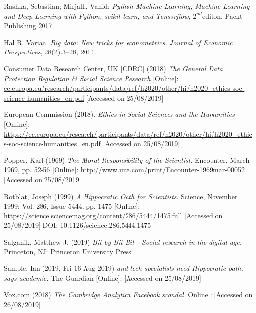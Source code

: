 \documentclass[12pt,a4paper]{article}
\begin{document}
Rashka, Sebastian; Mirjalli, Vahid; \textit{Python Machine Learning, Machine Learning and Deep Learning with Python, scikit-learn, and Tensorflow}, $2^{nd}$editon, Packt Publishing 2017.


Hal R. Varian. \textit{Big data: New tricks for econometrics. Journal of Economic Perspectives}, 28(2):3–28, 2014. 

Consumer Data Research Center, UK  [CDRC] (2018) \textit{The General Data Protection Regulation \& Social Science Research} [Online]: \href{https://ec.europa.eu/research/participants/data/ref/h2020/other/hi/h2020_ethics-soc-science-humanities_en.pdf}{ec.europa.eu/research/participants/data/ref/h2020/other/hi/h2020\_ethics-soc-science-humanities\_en.pdf} [Accessed on 25/08/2019]

European Commission (2018). \textit{Ethics in Social Sciences and the Humanities} [Online]: \href{https://ec.europa.eu/research/participants/data/ref/h2020/other/hi/h2020_ethics-soc-science-humanities_en.pdf}{https://ec.europa.eu/research/participants/data/ref/h2020/other/hi/h2020\_ethics-soc-science-humanities\_en.pdf} [Accessed on 25/08/2019] 

Popper, Karl (1969) \textit{The Moral Responsibility of the Scientist}. Encounter, March 1969, pp. 52-56 [Online]: \href{http://www.unz.com/print/Encounter-1969mar-00052}{http://www.unz.com/print/Encounter-1969mar-00052} [Accessed on 25/08/2019]

Rotblat, Joseph (1999) \textit{A Hippocratic Oath for Scientists}. Science, November 1999: Vol. 286, Issue 5444, pp. 1475 [Online]: \href{https://science.sciencemag.org/content/286/5444/1475.full}{https://science.sciencemag.org/content/286/5444/1475.full} [Accessed on 25/08/2019] DOI: 10.1126/science.286.5444.1475 

Salganik, Matthew J. (2019) \textit{Bit by Bit Bit - Social research in the digital age.} Princeton, NJ: Princeton University Press.

Sample, Ian (2019, Fri 16 Aug 2019) \textit{and tech specialists need Hippocratic oath, says academic.} The Guardian [Online]: \href{https://www.theguardian.com/science/2019/aug/16/mathematicians-need-doctor-style-hippocratic-oath-says-academic-hannah-fry} [Accessed on 25/08/2019]

Vox.com (2018) \textit{The Cambridge Analytica Facebook scandal} [Online]: \href{https://www.vox.com/2018/4/10/17207394/cambridge-analytica-facebook-zuckerberg-trump-privacy-scandal} [Accessed on 26/08/2019] 
\end{document}
